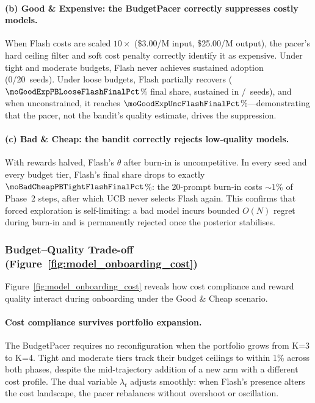 \paragraph{(b) Good \& Expensive: the BudgetPacer correctly suppresses
costly models.}
When Flash costs are scaled $10\times$ (\$3.00/M input,
\$25.00/M output), the pacer's hard ceiling filter and soft cost
penalty correctly identify it as expensive.
Under tight and moderate budgets, Flash never achieves sustained
adoption (0/20~seeds).
Under loose budgets, Flash partially recovers ($\moGoodExpPBLooseFlashFinalPct$\% final share,
sustained in \moGoodExpLooseNSustained/\moNseeds~seeds), and when unconstrained, it reaches
$\moGoodExpUncFlashFinalPct$\%---demonstrating that the pacer, not the bandit's quality
estimate, drives the suppression.

\paragraph{(c) Bad \& Cheap: the bandit correctly rejects low-quality models.}
With rewards halved, Flash's $\theta$ after burn-in is
uncompetitive.
In every seed and every budget tier, Flash's final share drops
to exactly $\moBadCheapPBTightFlashFinalPct$\%: the 20-prompt burn-in costs
${\sim}1$\% of Phase~2 steps, after which UCB never selects Flash
again.
This confirms that forced exploration is self-limiting: a bad model
incurs bounded $O(N)$ regret during burn-in and is permanently
rejected once the posterior stabilises.

\subsubsection{Budget--Quality Trade-off
(Figure~\ref{fig:model_onboarding_cost})}

Figure~\ref{fig:model_onboarding_cost} reveals how cost compliance
and reward quality interact during onboarding under the Good \&
Cheap scenario.

\paragraph{Cost compliance survives portfolio expansion.}
The BudgetPacer requires no reconfiguration when the portfolio
grows from K=3 to K=4.
Tight and moderate tiers track their budget ceilings to within
1\% across both phases, despite the mid-trajectory addition of a
new arm with a different cost profile.
The dual variable $\lambda_t$ adjusts smoothly: when Flash's
presence alters the cost landscape, the pacer rebalances without
overshoot or oscillation.

